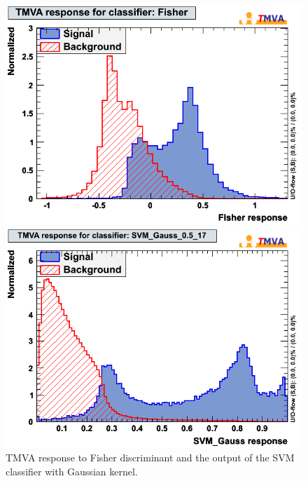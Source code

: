 \documentclass[a4paper]{jpconf}
\begin{document}
\begin{figure}[h]
 \begin{minipage}{8.0cm}
\includegraphics[width=1.0\textwidth]{images/mva_Fisher.png}
\end{minipage}
 \hfill
\begin{minipage}{8.0cm}
\includegraphics[width=1.0\textwidth]{images/mk_svm_gauss2.png}



\end{minipage}
\caption{\label{fig:fishersvm}TMVA response to Fisher discriminant and 
the output of the SVM classifier with Gaussian kernel.}
\end{figure}
\end{document}
